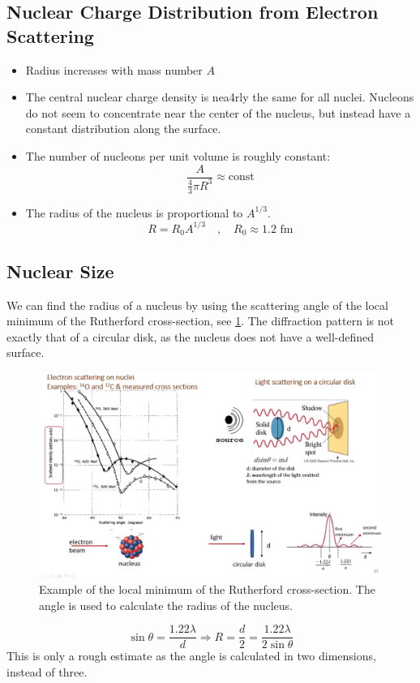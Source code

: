 \subsection{Nuclear Charge Distribution from Electron Scattering}\label{subsec: Nuclear Charge Distribution from Electron Scattering}
\begin{itemize}
    \item Radius increases with mass number $A$
    \item The central nuclear charge density is nea4rly the same for all nuclei. Nucleons do not seem to concentrate near the center of the nucleus, but instead have a constant distribution along the surface. 
    \item The number of nucleons per unit volume is roughly constant:
    \begin{equation}
    \frac{A}{\frac{4}{3}πR^3} ≈ \text{const}
    \end{equation} 
    \item The radius of the nucleus is proportional to $A^{1/3}$. 
    \begin{equation}
    R = R_0A^{1/3} \quad , \quad  R_0 ≈ 1.2 \text{ fm}
    \end{equation}
\end{itemize}

\subsection{Nuclear Size}
We can find the radius of a nucleus by using the scattering angle of the local minimum of the Rutherford cross-section, see \cref{fig: electron_scattering_angles}. The diffraction pattern is not exactly that of a circular disk, as the nucleus does not have a well-defined surface.
\begin{figure}[ht!]
\centering
\includegraphics[width = \textwidth]{electron_scattering_angles.png}
\caption{Example of the local minimum of the Rutherford cross-section. The angle is used to calculate the radius of the nucleus.}
\label{fig: electron_scattering_angles}
\end{figure}
\begin{equation}
\sin θ = \frac{1.22λ}{d} ⇒ R = \frac{d}{2} = \frac{1.22λ}{2\sin θ}
\end{equation}
This is only a rough estimate as the angle is calculated in two dimensions, instead of three. 


